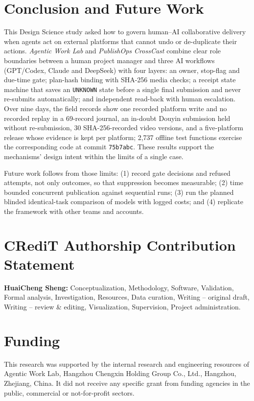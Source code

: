 \documentclass[11pt,a4paper]{article}
\theoremstyle{definition}
\begin{document}
\section{Conclusion and Future Work}
\label{sec:8}

This Design Science study asked how to govern human--AI collaborative delivery when agents act on external platforms that cannot undo or de-duplicate their actions. \emph{Agentic Work Lab} and \emph{PublishOps CrossCast} combine clear role boundaries between a human project manager and three AI workflows (GPT/Codex, Claude and DeepSeek) with four layers: an owner, stop-flag and due-time gate; plan-hash binding with SHA-256 media checks; a receipt state machine that saves an \texttt{UNKNOWN} state before a single final submission and never re-submits automatically; and independent read-back with human escalation. Over nine days, the field records show one recorded platform write and no recorded replay in a 69-record journal, an in-doubt Douyin submission held without re-submission, 30 SHA-256-recorded video versions, and a five-platform release whose evidence is kept per platform; 2,737 offline test functions exercise the corresponding code at commit \texttt{75b7abc}. These results support the mechanisms' design intent within the limits of a single case.

Future work follows from those limits: (1) record gate decisions and refused attempts, not only outcomes, so that suppression becomes measurable; (2) time bounded concurrent publication against sequential runs; (3) run the planned blinded identical-task comparison of models with logged costs; and (4) replicate the framework with other teams and accounts.

\section*{CRediT Authorship Contribution Statement}

\textbf{HuaiCheng Sheng:} Conceptualization, Methodology, Software, Validation, Formal analysis, Investigation, Resources, Data curation, Writing -- original draft, Writing -- review \& editing, Visualization, Supervision, Project administration.

\section*{Funding}

This research was supported by the internal research and engineering resources of Agentic Work Lab, Hangzhou Chengxin Holding Group Co., Ltd., Hangzhou, Zhejiang, China. It did not receive any specific grant from funding agencies in the public, commercial or not-for-profit sectors.
\end{document}
